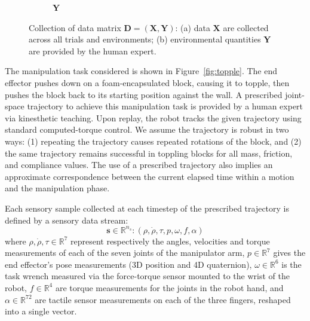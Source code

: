 \begin{figure}[h]
\begin{subfigure}[t]{0.43\linewidth}
    \caption{$\mathbf{Y}$}%
    \label{fig:Y_defn}
  \end{subfigure}
  \caption{Collection of data matrix $\mathbf{D} = (\mathbf{X},\mathbf{Y})$: (a) data $\mathbf{X}$ are collected across all trials and environments; (b) environmental quantities $\mathbf{Y}$ are provided by the human expert.}
  \label{fig:data_collect}
\end{figure}

The manipulation task considered is shown in Figure~\ref{fig:topple}. 
The end effector pushes down on a foam-encapsulated block, causing it to topple, then pushes the block back to its starting position against the wall.
A prescribed joint-space trajectory to achieve this manipulation task is provided by a human expert via kinesthetic teaching.
Upon replay, the robot tracks the given trajectory using standard computed-torque control.
We assume the trajectory is robust in two ways: (1) repeating the trajectory causes repeated rotations of the block, and (2) the same trajectory remains successful in toppling blocks for all mass, friction, and compliance values.
The use of a prescribed trajectory also implies an approximate correspondence between the current elapsed time within a motion and the manipulation phase.  

Each sensory sample collected at each timestep of the prescribed trajectory is defined by a sensory data stream:
\begin{equation}
\mathbf{s}\in\mathbb{R}^{n_s}:
(\rho,\dot{\rho},\tau,p,\omega,f,\alpha)
\end{equation}
  where $\rho,\dot{\rho},\tau\in\mathbb{R}^{7}$ represent respectively the angles, velocities and torque measurements of each of the seven joints of the manipulator arm, $p\in\mathbb{R}^{7}$ gives the end effector's pose measurements (3D position and 4D quaternion), $\omega \in\mathbb{R}^{6}$ is the task wrench measured via the force-torque sensor mounted to the wrist of the robot, $f \in\mathbb{R}^{4}$ are torque measurements for the joints in the robot hand, and $\alpha \in\mathbb{R}^{72}$ are tactile sensor measurements on each of the three fingers, reshaped into a single vector.

